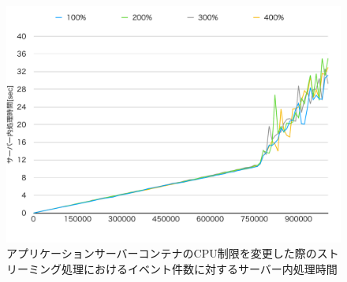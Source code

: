 \documentclass[../../../../../main]{subfiles}
\begin{document}
    \begin{figure}[H]
        \centering
        \includegraphics[width=12cm]{graph}
        \caption{アプリケーションサーバーコンテナのCPU制限を変更した際のストリーミング処理におけるイベント件数に対するサーバー内処理時間}
        \label{fig:stream-change-app-cpu-limit-server-time-app_1024-db_1_1024}
    \end{figure}
\end{document}
